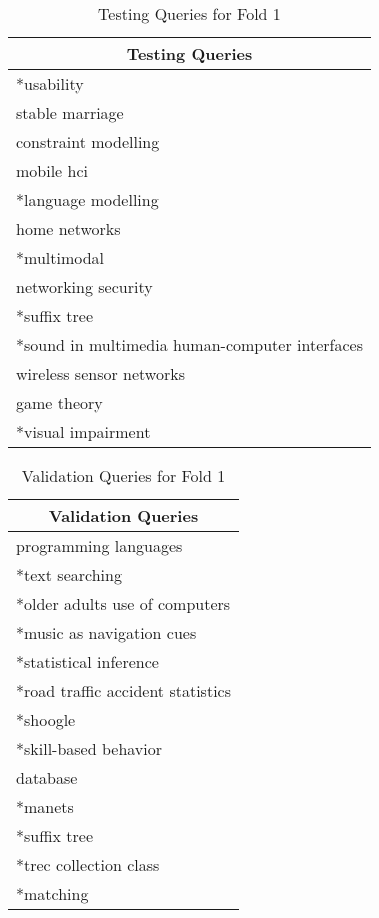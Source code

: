 \begin{table}
\centering
\begin{tabular}{|l|}
\hline \multicolumn{1}{|c|}{\textbf{Testing Queries}} \\
\hline *usability \\
\hline stable marriage \\
\hline constraint modelling \\
\hline mobile hci \\ 
\hline *language modelling \\
\hline home networks \\ 
\hline *multimodal \\
\hline networking security \\ 
\hline *suffix tree \\
\hline *sound in multimedia human-computer interfaces \\ 
\hline wireless sensor networks \\
\hline game theory \\ 
\hline *visual impairment \\
\hline
\end{tabular}
\caption{Testing Queries for Fold 1} \label{table:fold1testing}
\end{table}

\begin{table}
\centering
\begin{tabular}{|l|}
\hline \multicolumn{1}{|c|}{\textbf{Validation Queries}} \\
\hline programming languages \\
\hline *text searching \\
\hline *older adults use of computers \\
\hline *music as navigation cues \\ 
\hline *statistical inference \\
\hline *road traffic accident statistics \\ 
\hline *shoogle \\
\hline *skill-based behavior \\ 
\hline database \\
\hline *manets \\ 
\hline *suffix tree \\
\hline *trec collection class \\ 
\hline *matching \\
\hline
\end{tabular}
\caption{Validation Queries for Fold 1} \label{table:fold1validating}
\end{table}

